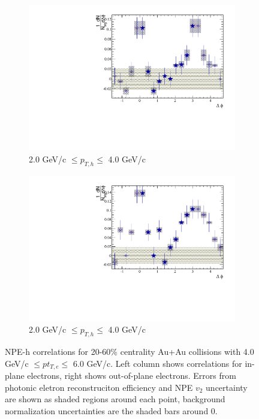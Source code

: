 \begin{figure}[htbp]
	\begin{subfigure}{0.5\textwidth}
		\includegraphics[width=\textwidth]{Plots/Correlations/EP/subtracted/NPE_subtracted_eh_corr_inplane_primpt_4_5_cent_2_5_assopt_3_4.pdf}
		\caption{2.0 GeV/c $\leq p_{T,h} \leq$ 4.0 GeV/c}
		\label{fig:EP_corr_subtracted_e}
	\end{subfigure}	
	\begin{subfigure}{0.5\textwidth}
		\includegraphics[width=\textwidth]{Plots/Correlations/EP/subtracted/NPE_subtracted_eh_corr_outplane_primpt_4_5_cent_2_5_assopt_3_4.pdf}
		\caption{2.0 GeV/c $\leq p_{T,h} \leq$ 4.0 GeV/c}
		\label{fig:EP_corr_subtracted_f}
	\end{subfigure}	
\caption[Subtracted NPE-hadron Correlations, In-plane and Out-of-plane]{NPE-h correlations for 20-60\% centrality Au+Au collisions with 4.0 GeV/c $\leq pt_{T,e} \leq$ 6.0 GeV/c. Left column shows correlations for in-plane electrons, right shows out-of-plane electrons. Errors from photonic eletron reconstruciton efficiency and NPE $v_2$ uncertainty are shown as shaded regions around each point, background normalization uncertainties are the shaded bars around 0.}
\label{fig:EP_corr_subtracted}
\end{figure}

